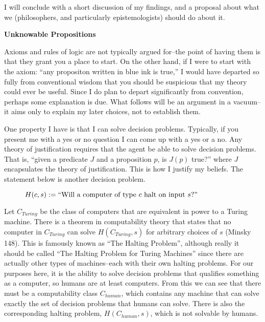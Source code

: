 \documentclass[12pt]{article}
\begin{document}
\begin{flushleft}
I will conclude with a short discussion of my findings, and a proposal about what we (philosophers, and particularly epistemologists) should do about it.

\setlength{\parindent}{0in}
\par\bigskip
\textbf{Unknowable Propositions}
\setlength{\parindent}{0.5in}

Axioms and rules of logic are not typically argued for--the point of having them is that they grant you a place to start.
On the other hand, if I were to start with the axiom: ``any propositon written in blue ink is true,'' I would have departed so fully from conventional wisdom that you should be suspicious that my theory could ever be useful.
Since I do plan to depart significantly from convention, perhaps some explanation is due.
What follows will be an argument in a vacuum--it aims only to explain my later choices, not to establish them.

One property I have is that I can solve decision problems.
Typically, if you present me with a yes or no question I can come up with a yes or a no.
Any theory of justification requires that the agent be able to solve decision problems.
That is, ``given a predicate $J$ and a proposition $p$, is $J(p)$ true?'' where $J$ encapsulates the theory of justification.
This is how I justify my beliefs.
The statement below is another decision problem.

\par\medskip
\begin{figure}[h]
    \centering
$H(c, s) := \textnormal{``Will a computer of type } c \textnormal{ halt on input } s \textnormal{?''}$
\end{figure}

Let $C_{Turing}$ be the class of computers that are equivalent in power to a Turing machine.
There is a theorem in computability theory that states that no computer in $C_{Turing}$ can solve $H(C_{Turing}, s)$ for arbitrary choices of $s$ (Minsky 148).
This is famously known as ``The Halting Problem'', although really it should be called ``The Halting Problem for Turing Machines'' since there are actually other types of machines--each with their own halting problems.
For our purposes here, it is the ability to solve decision problems that qualifies something as a computer, so humans are at least computers.
From this we can see that there must be a computability class $C_{human}$, which contains any machine that can solve exactly the set of decision problems that humans can solve.
There is also the corresponding halting problem, $H(C_{human}, s)$, which is not solvable by humans.


\end{flushleft}
\end{document}
